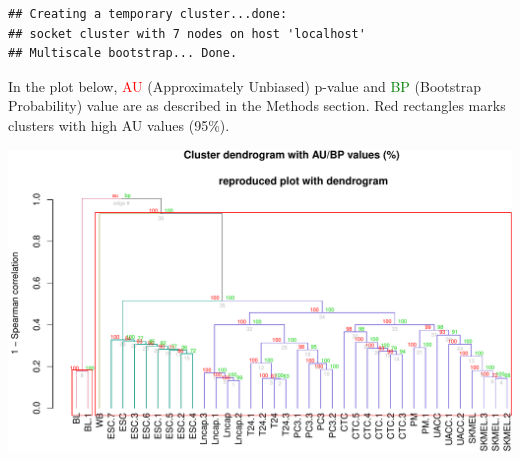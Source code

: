 \documentclass[]{article}
\newenvironment{Shaded}{\begin{snugshade}}{\end{snugshade}}
\newcommand{\KeywordTok}[1]{\textcolor[rgb]{0.13,0.29,0.53}{\textbf{#1}}}
\newcommand{\DataTypeTok}[1]{\textcolor[rgb]{0.13,0.29,0.53}{#1}}
\newcommand{\DecValTok}[1]{\textcolor[rgb]{0.00,0.00,0.81}{#1}}
\newcommand{\FloatTok}[1]{\textcolor[rgb]{0.00,0.00,0.81}{#1}}
\newcommand{\CharTok}[1]{\textcolor[rgb]{0.31,0.60,0.02}{#1}}
\newcommand{\StringTok}[1]{\textcolor[rgb]{0.31,0.60,0.02}{#1}}
\newcommand{\OperatorTok}[1]{\textcolor[rgb]{0.81,0.36,0.00}{\textbf{#1}}}
\newcommand{\NormalTok}[1]{#1}
\begin{document}
\begin{verbatim}
## Creating a temporary cluster...done:
## socket cluster with 7 nodes on host 'localhost'
## Multiscale bootstrap... Done.
\end{verbatim}

In the plot below, \textcolor{red}{AU} (Approximately Unbiased) p-value
and \textcolor{green}{BP} (Bootstrap Probability) value are as described
in the Methods section. Red rectangles marks clusters with high AU
values (95\%).

\begin{Shaded}
\end{Shaded}

\includegraphics{Project_jankauskaite_ugne_files/figure-latex/unnamed-chunk-34-1.pdf}
\end{document}
